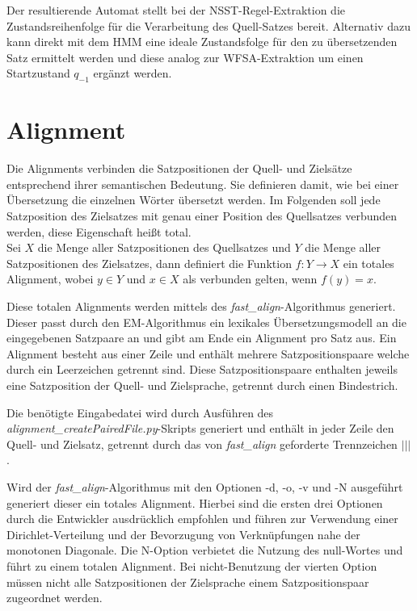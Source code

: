 \documentclass[conference]{IEEEtran}
\begin{document}
Der resultierende Automat stellt bei der NSST-Regel-Extraktion die Zustandsreihenfolge für die Verarbeitung des Quell-Satzes bereit.
Alternativ dazu kann direkt mit dem HMM eine ideale Zustandsfolge für den zu übersetzenden Satz ermittelt werden und diese analog zur WFSA-Extraktion um einen Startzustand $q_{-1}$ ergänzt werden.

\section{Alignment}
Die Alignments verbinden die Satzpositionen der Quell- und Zielsätze entsprechend ihrer semantischen Bedeutung.
Sie definieren damit, wie bei einer Übersetzung die einzelnen Wörter übersetzt werden.
Im Folgenden soll jede Satzposition des Zielsatzes mit genau einer Position des Quellsatzes verbunden werden, diese Eigenschaft heißt total. \\
Sei $X$ die Menge aller Satzpositionen des Quellsatzes und $Y$ die Menge aller Satzpositionen des Zielsatzes, dann definiert die Funktion $f\colon Y \rightarrow X$ ein totales Alignment, wobei $y \in Y$ und $x \in X$ als verbunden gelten, wenn $f(y) = x$.

Diese totalen Alignments werden mittels des \textit{fast\_align}-Algorithmus \cite{fast_align} generiert.
Dieser passt durch den EM-Algorithmus ein lexikales Übersetzungsmodell an die eingegebenen Satzpaare an \cite{fast_align} und gibt am Ende ein Alignment pro Satz aus.
Ein Alignment besteht aus einer Zeile und enthält mehrere Satzpositionspaare welche durch ein Leerzeichen getrennt sind.
Diese Satzpositionspaare enthalten jeweils eine Satzposition der Quell- und Zielsprache, getrennt durch einen Bindestrich.

Die benötigte Eingabedatei wird durch Ausführen des \textit{alignment\_createPairedFile.py}-Skripts generiert und enthält in jeder Zeile den Quell- und Zielsatz, getrennt durch das von \textit{fast\_align} geforderte Trennzeichen \glqq{} $ ||| $ \grqq .

Wird der \textit{fast\_align}-Algorithmus mit den Optionen -d, -o, -v und -N ausgeführt generiert dieser ein totales Alignment.
Hierbei sind die ersten drei Optionen durch die Entwickler ausdrücklich empfohlen und führen zur Verwendung einer Dirichlet-Verteilung und der Bevorzugung von Verknüpfungen nahe der monotonen Diagonale. 
Die N-Option verbietet die Nutzung des null-Wortes und führt zu einem totalen Alignment.
Bei nicht-Benutzung der vierten Option müssen nicht alle Satzpositionen der Zielsprache einem Satzpositionspaar zugeordnet werden.
\end{document}
